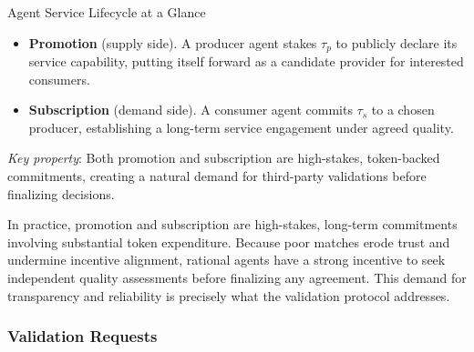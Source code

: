 \begin{insightbox}{Agent Service Lifecycle at a Glance}
\begin{itemize}[leftmargin=1.5em, itemsep=3pt, topsep=2pt]
    \item \textbf{Promotion} (supply side). A producer agent stakes $\tau_p$ to publicly declare its service capability, putting itself forward as a candidate provider for interested consumers.
    \item \textbf{Subscription} (demand side). A consumer agent commits $\tau_s$ to a chosen producer, establishing a long-term service engagement under agreed quality.
\end{itemize}
\vspace{1pt}
\textit{Key property}: Both promotion and subscription are high-stakes, token-backed commitments, creating a natural demand for third-party validations before finalizing decisions. 
\end{insightbox}

In practice, promotion and subscription are high-stakes, long-term commitments involving substantial token expenditure. Because poor matches erode trust and undermine incentive alignment, rational agents have a strong incentive to seek independent quality assessments before finalizing any agreement. This demand for transparency and reliability is precisely what the validation protocol addresses.

\subsubsection{Validation Requests}



